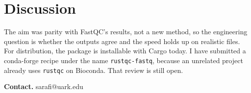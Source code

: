 \section{Discussion}
The aim was parity with FastQC's results, not a new method, so the engineering question is whether the outputs agree and the speed holds up on realistic files. For distribution, the package is installable with Cargo today. I have submitted a conda-forge recipe under the name \texttt{rustqc-fastq}, because an unrelated project already uses \texttt{rustqc} on Bioconda. That review is still open.

\textbf{Contact.} sarafi@uark.edu

